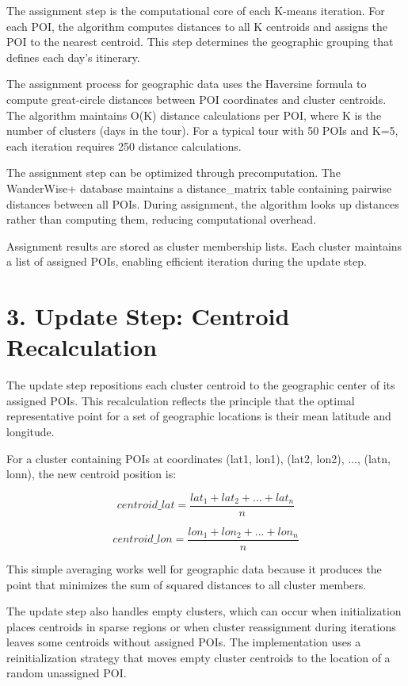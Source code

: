 The assignment step is the computational core of each K-means iteration. For each POI, the algorithm computes distances to all K centroids and assigns the POI to the nearest centroid. This step determines the geographic grouping that defines each day's itinerary.

The assignment process for geographic data uses the Haversine formula to compute great-circle distances between POI coordinates and cluster centroids. The algorithm maintains O(K) distance calculations per POI, where K is the number of clusters (days in the tour). For a typical tour with 50 POIs and K=5, each iteration requires 250 distance calculations.

The assignment step can be optimized through precomputation. The WanderWise+ database maintains a distance\_matrix table containing pairwise distances between all POIs. During assignment, the algorithm looks up distances rather than computing them, reducing computational overhead.

Assignment results are stored as cluster membership lists. Each cluster maintains a list of assigned POIs, enabling efficient iteration during the update step.

\section{3. Update Step: Centroid Recalculation}

The update step repositions each cluster centroid to the geographic center of its assigned POIs. This recalculation reflects the principle that the optimal representative point for a set of geographic locations is their mean latitude and longitude.

For a cluster containing POIs at coordinates (lat1, lon1), (lat2, lon2), ..., (latn, lonn), the new centroid position is:

\begin{equation}
centroid\_lat = \frac{lat_1 + lat_2 + ... + lat_n}{n}
\end{equation}

\begin{equation}
centroid\_lon = \frac{lon_1 + lon_2 + ... + lon_n}{n}
\end{equation}

This simple averaging works well for geographic data because it produces the point that minimizes the sum of squared distances to all cluster members.

The update step also handles empty clusters, which can occur when initialization places centroids in sparse regions or when cluster reassignment during iterations leaves some centroids without assigned POIs. The implementation uses a reinitialization strategy that moves empty cluster centroids to the location of a random unassigned POI.

